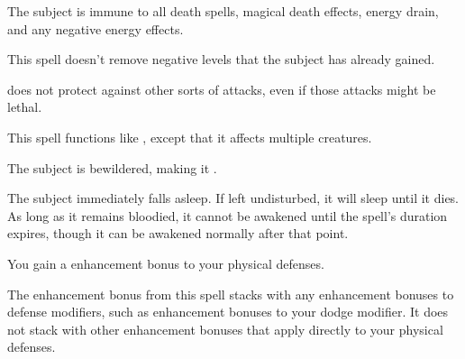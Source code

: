 \spellrng{\rngclose}
\spelldur{\durshort}
\begin{spelleffect}
  The subject is immune to all death spells, magical death effects, energy drain, and any negative energy effects.
\end{spelleffect}
\begin{spellnotes}
  This spell doesn't remove negative levels that the subject has already gained.
  \par {} does not protect against other sorts of attacks, even if those attacks might be lethal.
\end{spellnotes}

\spellrng{\rngmed}
\begin{spelleffect}
  This spell functions like , except that it affects multiple creatures.
\end{spelleffect}

\spellrng{\rngmed}
\spelldur{\durlong}
\begin{spellhealthy}
  The subject is bewildered, making it \vulnerable.
\end{spellhealthy}
\begin{spellblood}
  The subject immediately falls asleep. If left undisturbed, it will sleep until it dies. As long as it remains bloodied, it cannot be awakened until the spell's duration expires, though it can be awakened normally after that point.
\end{spellblood}

\spelldur{\durlong}
\begin{spelleffect}
    You gain a  enhancement bonus to your physical defenses. \bonusscalingdescription
\end{spelleffect}
\begin{spellnotes}
    The enhancement bonus from this spell stacks with any enhancement bonuses to defense modifiers, such as enhancement bonuses to your dodge modifier. It does not stack with other enhancement bonuses that apply directly to your physical defenses. 
\end{spellnotes}

